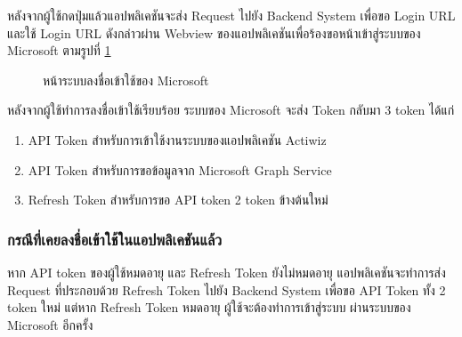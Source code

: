 \documentclass[14pt,oneside,openright,a4paper]{cpe-thai-project}
\begin{document}
หลังจากผู้ใช้กดปุ่มแล้วแอปพลิเคชันจะส่ง Request ไปยัง Backend System เพื่อขอ Login URL และใช้ Login URL ดังกล่าวผ่าน Webview ของแอปพลิเคชันเพื่อร้องขอหน้าเข้าสู่ระบบของ Microsoft ตามรูปที่ \ref{fig:2}

\begin{figure}[H]\centering
  \setlength{\fboxrule}{0.5mm}
  \setlength{\fboxsep}{0.5cm}
  \caption{หน้าระบบลงชื่อเข้าใช้ของ Microsoft}\label{fig:2}
 \end{figure}

 หลังจากผู้ใช้ทำการลงชื่อเข้าใช้เรียบร้อย ระบบของ Microsoft จะส่ง Token กลับมา 3 token ได้แก่
 \begin{enumerate}
  \item API Token สำหรับการเข้าใช้งานระบบของแอปพลิเคชัน Actiwiz
  \item API Token สำหรับการขอข้อมูลจาก Microsoft Graph Service 
  \item Refresh Token สำหรับการขอ API token 2 token ข้างต้นใหม่
\end{enumerate}
 
 \subsubsection{กรณีที่เคยลงชื่อเข้าใช้ในแอปพลิเคชันแล้ว}
 หาก API token ของผู้ใช้หมดอายุ และ Refresh Token ยังไม่หมดอายุ แอปพลิเคชันจะทำการส่ง Request ที่ประกอบด้วย Refresh Token ไปยัง Backend System เพื่อขอ API Token ทั้ง 2 token ใหม่ แต่หาก Refresh Token หมดอายุ ผู้ใช้จะต้องทำการเข้าสู่ระบบ ผ่านระบบของ Microsoft อีกครั้ง
 
\end{document}
